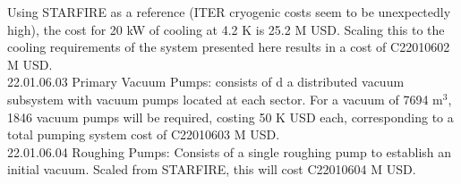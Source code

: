 Using STARFIRE as a reference (ITER cryogenic costs seem to be unexpectedly high), the cost for 20 kW of cooling at 4.2 K is 25.2 M USD. Scaling this to the cooling requirements of the system presented here results in a cost of C22010602 M USD. \\



22.01.06.03 Primary Vacuum Pumps: consists of d a distributed vacuum subsystem with vacuum pumps located at each sector. For a vacuum of 7694 m$^3$, 1846 vacuum pumps will be required, costing 50 K USD each, corresponding to a total pumping system cost of C22010603 M USD.\\

22.01.06.04 Roughing Pumps: Consists of a single roughing pump to establish an initial vacuum. Scaled from STARFIRE, this will cost C22010604 M USD.

